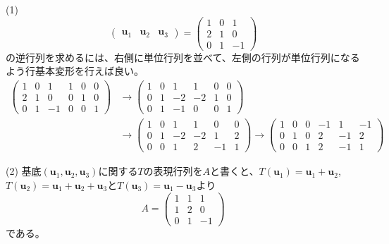 \noindent (1)
\[
\begin{pmatrix}
\bm{u}_1 & \bm{u}_2 & \bm{u}_3
\end{pmatrix}
=
\left(\begin{array}{rrr}
1 & 0 & 1 \\
2 & 1 & 0 \\
0 & 1 & -1
\end{array}
\right)
\]
の逆行列を求めるには、右側に単位行列を並べて、左側の行列が単位行列になるよう行基本変形を行えば良い。
\begin{align*}
\left(
\begin{array}{rrr|rrr}
1 & 0 & 1 & 1 & 0 & 0 \\
2 & 1 & 0 & 0 & 1 & 0 \\
0 & 1 & -1 & 0 & 0 & 1
\end{array}
\right)
&\rightarrow
\left(
\begin{array}{rrr|rrr}
1 & 0 & 1 & 1 & 0 & 0 \\
0 & 1 & -2 & -2 & 1 & 0 \\
0 & 1 & -1 & 0 & 0 & 1
\end{array}
\right) \\
&\rightarrow
\left(
\begin{array}{rrr|rrr}
1 & 0 & 1 & 1 & 0 & 0 \\
0 & 1 & -2 & -2 & 1 & 2 \\
0 & 0 & 1 & 2 & -1 & 1
\end{array}
\right)
\rightarrow
\left(
\begin{array}{rrr|rrr}
1 & 0 & 0 & -1 & 1 & -1 \\
0 & 1 & 0 & 2 & -1 & 2 \\
0 & 0 & 1 & 2 & -1 & 1
\end{array} \right)
\end{align*}

\noindent (2) 基底$(\bm{u}_1, \bm{u}_2, \bm{u}_3)$に関する$T$の表現行列を$A$と書くと、$T(\bm{u}_1) = \bm{u}_1 + \bm{u}_2$, $T(\bm{u}_2) = \bm{u}_1 + \bm{u}_2 + \bm{u}_3$と$T(\bm{u}_3) = \bm{u}_1 - \bm{u}_3$より
\[
A =
\begin{pmatrix}
1 & 1 & 1 \\
1 & 2 & 0 \\
0 & 1 & -1
\end{pmatrix}
\]
である。


